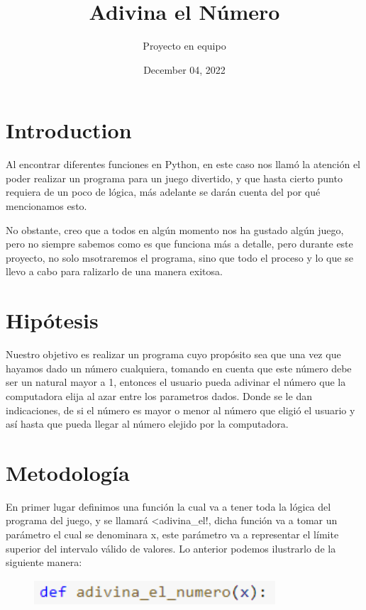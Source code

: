 \documentclass[a4paper,12pt]{article}
\title{Adivina el Número}
\author{Proyecto en equipo }
\date{December 04, 2022}
\begin{document}
\maketitle

\section{Introduction}
\large{Al encontrar diferentes funciones en Python, en este caso nos llamó la atención el poder realizar un programa para un juego divertido, y que hasta cierto punto requiera de un poco de lógica, más adelante se darán cuenta del por qué mencionamos esto.

No obstante, creo que a todos en algún momento nos ha gustado algún juego, pero no siempre sabemos como es que funciona más a detalle, pero durante este proyecto, no solo msotraremos el programa, sino que todo el proceso y lo que se llevo a cabo para ralizarlo de una manera exitosa.}

\section{Hipótesis}
\large{Nuestro objetivo es realizar un programa cuyo propósito sea que una vez que hayamos  dado un número cualquiera, tomando en cuenta que este número debe ser un natural mayor a 1, entonces el  usuario pueda adivinar el número que la computadora elija al azar entre los parametros dados. Donde se le dan indicaciones, de si el número es mayor o menor al número que eligió el usuario y así hasta que pueda llegar al número elejido por la computadora.} 

\section{Metodología}
\large{En primer lugar definimos una función la cual va a tener toda la lógica del programa del juego, y se llamará <adivina\_el!, dicha función va a tomar un parámetro el cual se denominara x, este parámetro va a representar el límite superior del intervalo válido de valores. Lo anterior podemos ilustrarlo de la siguiente manera:}


\begin{figure}[H]
    \caption{}
    \centering \includegraphics[width=9cm, height=1cm]{a_1.png}
    \label{fig1:my_label}
\end{figure}
\end{document}
